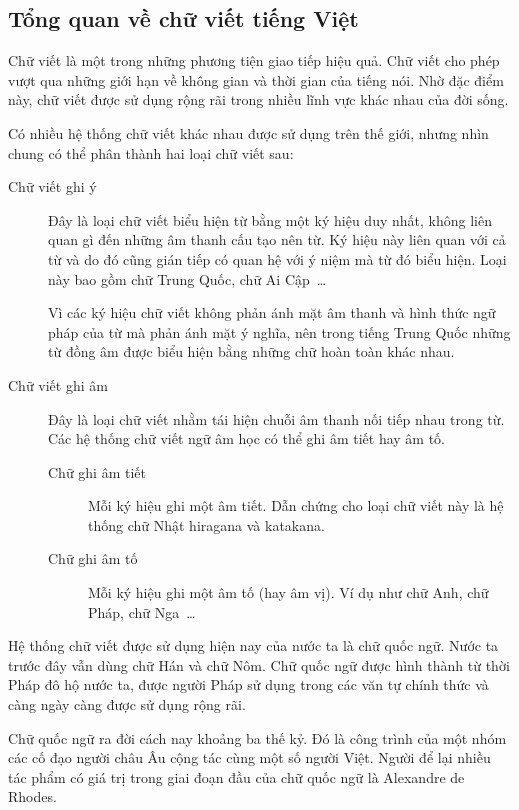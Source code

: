 \documentclass[a4paper,oneside]{book} %
\theoremstyle{break}
\begin{document}
\subsection{Tổng quan về chữ viết tiếng Việt}



Chữ viết là một trong những phương tiện giao tiếp hiệu quả. Chữ viết
cho phép vượt qua những giới hạn về không gian và thời gian của tiếng
nói. Nhờ đặc điểm này, chữ viết được sử dụng rộng rãi trong nhiều lĩnh
vực khác nhau của đời sống.

Có nhiều hệ thống chữ viết khác nhau được sử dụng trên thế giới, nhưng
nhìn chung có thể phân thành hai loại chữ viết sau:
\begin{description}
\item[Chữ viết ghi ý] Đây là loại chữ viết biểu hiện từ bằng một ký
  hiệu duy nhất, không liên quan gì đến những âm thanh cấu tạo nên
  từ. Ký hiệu này liên quan với cả từ và do đó cũng gián tiếp có quan
  hệ với ý niệm mà từ đó biểu hiện. Loại này bao gồm chữ Trung Quốc, chữ Ai
  Cập~\ldots

  Vì các ký hiệu chữ viết không phản ánh mặt âm thanh và hình thức ngữ
  pháp của từ mà phản ánh mặt ý nghĩa, nên trong tiếng Trung Quốc
  những từ đồng âm được biểu hiện bằng những chữ hoàn toàn khác nhau.

\item[Chữ viết ghi âm] Đây là loại chữ viết nhằm tái hiện chuỗi âm
  thanh nối tiếp nhau trong từ. Các hệ thống chữ viết ngữ âm học có
  thể ghi âm tiết hay âm tố.
  \begin{description}
  \item[Chữ ghi âm tiết] Mỗi ký hiệu ghi một âm tiết. Dẫn chứng cho
  loại chữ viết này là hệ thống chữ Nhật hiragana và katakana.

  \item[Chữ ghi âm tố] Mỗi ký hiệu ghi một âm tố (hay âm vị). Ví dụ
  như chữ Anh, chữ Pháp, chữ Nga~\ldots

  \end{description}
\end{description}

Hệ thống chữ viết được sử dụng hiện nay của nước ta là chữ quốc
ngữ. Nước ta trước đây vẫn dùng chữ Hán và chữ Nôm. Chữ quốc ngữ được
hình thành từ thời Pháp đô hộ nước ta, được người Pháp sử dụng
trong các văn tự chính thức và càng ngày càng được sử dụng rộng rãi.

Chữ quốc ngữ ra đời cách nay khoảng ba thế kỷ. Đó là công trình của
một nhóm các cố đạo người châu Âu cộng tác cùng một số người
Việt. Người để lại nhiều tác phẩm có giá trị trong giai đoạn đầu của
chữ quốc ngữ là Alexandre de Rhodes.
\end{document}
